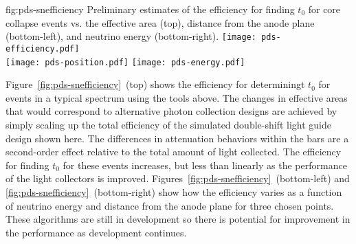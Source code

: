 \begin{dunefigure}{fig:pds-snefficiency}
{Preliminary estimates of the efficiency for finding $t_0$ for core collapse  events vs. the effective area (top), distance from the anode plane (bottom-left), and neutrino energy (bottom-right).}
  \texttt{[image: pds-efficiency.pdf]}\\
  \texttt{[image: pds-position.pdf]}
  \texttt{[image: pds-energy.pdf]}
\end{dunefigure}


Figure~\ref{fig:pds-snefficiency}~(top) shows the efficiency for determiningt $t_0$ for events in a typical  spectrum using the tools above. The changes in effective areas that would correspond to alternative photon collection designs are achieved by simply scaling up the total efficiency of the simulated double-shift light guide design shown here. The differences in attenuation behaviors within the bars are a second-order effect relative to the total amount of light collected. The efficiency for finding $t_0$ for these events increases, but less than linearly as the performance of the light collectors is improved. Figures~\ref{fig:pds-snefficiency}~(bottom-left) and \ref{fig:pds-snefficiency}~(bottom-right) show how the efficiency varies as a function of neutrino energy and distance from the anode plane for three chosen points.  These algorithms are still in development so there is potential for improvement in the performance as development continues.

